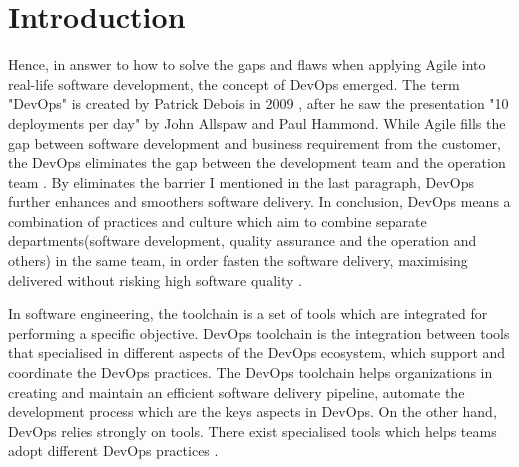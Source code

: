 \chapter{Introduction}
\label{chp:introduction}
\par
Hence, in answer to how to solve the gaps and flaws when applying Agile into real-life software development, the concept of DevOps emerged. The term "DevOps" is created by Patrick Debois in 2009 \cite{kim2016devops}, after he saw the presentation "10 deployments per day" by John Allspaw and Paul Hammond. While Agile fills the gap between software development and business requirement from the customer, the DevOps eliminates the gap between the development team and the operation team \cite{WhatisaD20:online}. By eliminates the barrier I mentioned in the last paragraph, DevOps further enhances and smoothers software delivery. In conclusion, DevOps means a combination of practices and culture which aim to combine separate departments(software development, quality assurance and the operation and others) in the same team, in order fasten the software delivery, maximising delivered without risking high software quality \cite{DevOpsWi87:online}\cite{ebert2016devops}.
\par
In software engineering, the toolchain is a set of tools which are integrated for performing a specific objective. DevOps toolchain is the integration between tools that specialised in different aspects of the DevOps ecosystem, which support and coordinate the DevOps practices. The DevOps toolchain helps organizations in creating and maintain an efficient software delivery pipeline, automate the development process \cite{DevOpsto7:online} which are the keys aspects in DevOps. On the other hand, DevOps relies strongly on tools. There exist specialised tools which helps teams adopt different DevOps practices \cite{zhu2016devops}. 
